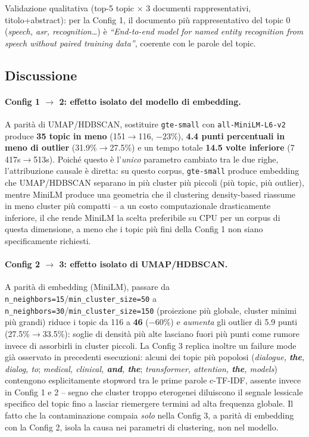 \documentclass[12pt,a4paper]{article}
\begin{document}
Validazione qualitativa (top-5 topic $\times$ 3 documenti rappresentativi, titolo+abstract): per la Config 1, il documento pi\`u rappresentativo del topic 0 (\textit{speech, asr, recognition\dots}) \`e \textit{``End-to-end model for named entity recognition from speech without paired training data''}, coerente con le parole del topic.

\subsection{Discussione}

\paragraph{Config 1 $\to$ 2: effetto isolato del modello di embedding.} A parit\`a di UMAP/HDBSCAN, sostituire \texttt{gte-small} con \texttt{all-MiniLM-L6-v2} produce \textbf{35 topic in meno} (151$\to$116, $-23\%$), \textbf{4.4 punti percentuali in meno di outlier} (31.9\%$\to$27.5\%) e un tempo totale \textbf{14.5 volte inferiore} (7\,417s$\to$513s). Poich\'e questo \`e l'\emph{unico} parametro cambiato tra le due righe, l'attribuzione causale \`e diretta: su questo corpus, \texttt{gte-small} produce embedding che UMAP/HDBSCAN separano in pi\`u cluster pi\`u piccoli (pi\`u topic, pi\`u outlier), mentre MiniLM produce una geometria che il clustering density-based riassume in meno cluster pi\`u compatti -- a un costo computazionale drasticamente inferiore, il che rende MiniLM la scelta preferibile su CPU per un corpus di questa dimensione, a meno che i topic pi\`u fini della Config 1 non siano specificamente richiesti.

\paragraph{Config 2 $\to$ 3: effetto isolato di UMAP/HDBSCAN.} A parit\`a di embedding (MiniLM), passare da \texttt{n\_neighbors=15}/\texttt{min\_cluster\_size=50} a \texttt{n\_neighbors=30}/\texttt{min\_cluster\_size=150} (proiezione pi\`u globale, cluster minimi pi\`u grandi) riduce i topic da 116 a \textbf{46} ($-60\%$) e \emph{aumenta} gli outlier di 5.9 punti (27.5\%$\to$33.5\%): soglie di densit\`a pi\`u alte lasciano fuori pi\`u punti come rumore invece di assorbirli in cluster piccoli. La Config 3 replica inoltre un failure mode gi\`a osservato in precedenti esecuzioni: alcuni dei topic pi\`u popolosi (\textit{dialogue, \textbf{the}, dialog, to}; \textit{medical, clinical, \textbf{and}, \textbf{the}}; \textit{transformer, attention, \textbf{the}, models}) contengono esplicitamente stopword tra le prime parole c-TF-IDF, assente invece in Config 1 e 2 -- segno che cluster troppo eterogenei diluiscono il segnale lessicale specifico del topic fino a lasciar riemergere termini ad alta frequenza globale. Il fatto che la contaminazione compaia \emph{solo} nella Config 3, a parit\`a di embedding con la Config 2, isola la causa nei parametri di clustering, non nel modello.
\end{document}
